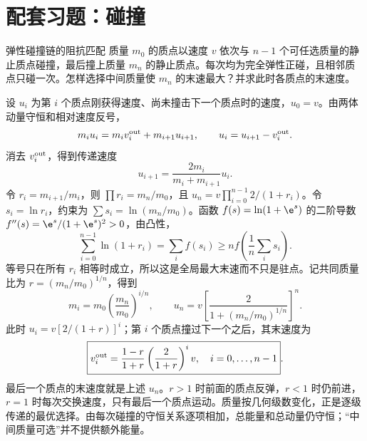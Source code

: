 \section{配套习题：碰撞}
\label{r2ch02:sec:practice-collision}

\begin{practicebox}{弹性碰撞链的阻抗匹配}
质量 $m_0$ 的质点以速度 $v$ 依次与 $n-1$ 个可任选质量的静止质点碰撞，最后撞上质量 $m_n$ 的静止质点。每次均为完全弹性正碰，且相邻质点只碰一次。怎样选择中间质量使 $m_n$ 的末速最大？并求此时各质点的末速度。
\label{r2ch02:pr:015}
\begin{solution}
设 $u_i$ 为第 $i$ 个质点刚获得速度、尚未撞击下一个质点时的速度，$u_0=v$。由两体动量守恒和相对速度反号，
\[
 m_i u_i=m_i v_i^{\rm out}+m_{i+1}u_{i+1},\qquad
 u_i=u_{i+1}-v_i^{\rm out}.
\]
消去 $v_i^{\rm out}$，得到传递速度
\[
 u_{i+1}=\frac{2m_i}{m_i+m_{i+1}}u_i.
\]
令 $r_i=m_{i+1}/m_i$，则 $\prod r_i=m_n/m_0$，且
$u_n=v\prod_{i=0}^{n-1}2/(1+r_i)$。令 $s_i=\ln r_i$，约束为
$\sum s_i=\ln(m_n/m_0)$。函数 $f(s)=\ln(1+\e^s)$ 的二阶导数
$f''(s)=\e^s/(1+\e^s)^2>0$，由凸性，
\[
 \sum_{i=0}^{n-1}\ln(1+r_i)
 =\sum_i f(s_i)\geqslant n f\!\left(\frac1n\sum_i s_i\right).
\]
等号只在所有 $r_i$ 相等时成立，所以这是全局最大末速而不只是驻点。记共同质量比为 $r=(m_n/m_0)^{1/n}$，得到
\[
 \boxed{m_i=m_0\left(\frac{m_n}{m_0}\right)^{i/n}},\qquad
 \boxed{u_n=v\left[\frac{2}{1+(m_n/m_0)^{1/n}}\right]^n}.
\]
此时 $u_i=v[2/(1+r)]^i$；第 $i$ 个质点撞过下一个之后，其末速度为
\[
 \boxed{v_i^{\rm out}=\frac{1-r}{1+r}
       \left(\frac2{1+r}\right)^i v,\quad i=0,\ldots,n-1}.
\]
最后一个质点的末速度就是上述 $u_n$。$r>1$ 时前面的质点反弹，$r<1$ 时仍前进，$r=1$ 时每次交换速度，只有最后一个质点运动。质量按几何级数变化，正是逐级传递的最优选择。由每次碰撞的守恒关系逐项相加，总能量和总动量仍守恒；“中间质量可选”并不提供额外能量。
\end{solution}
\end{practicebox}

